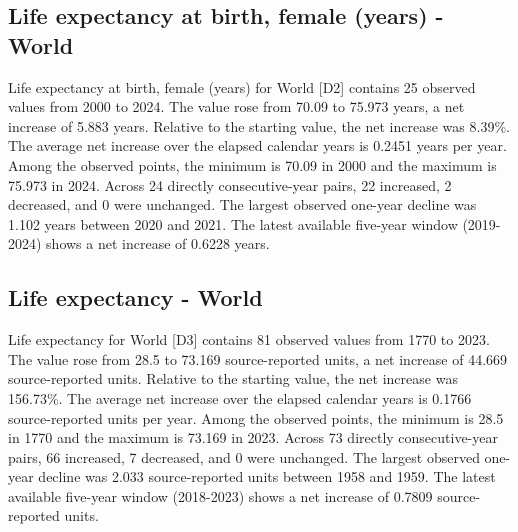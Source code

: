 \documentclass[10pt,a4paper]{article}
\begin{document}
\subsection*{Life expectancy at birth, female (years) - World}
Life expectancy at birth, female (years) for World [D2] contains 25 observed values from 2000 to 2024. The value rose from 70.09 to 75.973 years, a net increase of 5.883 years. Relative to the starting value, the net increase was 8.39\%. The average net increase over the elapsed calendar years is 0.2451 years per year. Among the observed points, the minimum is 70.09 in 2000 and the maximum is 75.973 in 2024. Across 24 directly consecutive-year pairs, 22 increased, 2 decreased, and 0 were unchanged. The largest observed one-year decline was 1.102 years between 2020 and 2021. The latest available five-year window (2019-2024) shows a net increase of 0.6228 years.
\subsection*{Life expectancy - World}
Life expectancy for World [D3] contains 81 observed values from 1770 to 2023. The value rose from 28.5 to 73.169 source-reported units, a net increase of 44.669 source-reported units. Relative to the starting value, the net increase was 156.73\%. The average net increase over the elapsed calendar years is 0.1766 source-reported units per year. Among the observed points, the minimum is 28.5 in 1770 and the maximum is 73.169 in 2023. Across 73 directly consecutive-year pairs, 66 increased, 7 decreased, and 0 were unchanged. The largest observed one-year decline was 2.033 source-reported units between 1958 and 1959. The latest available five-year window (2018-2023) shows a net increase of 0.7809 source-reported units.
\end{document}
